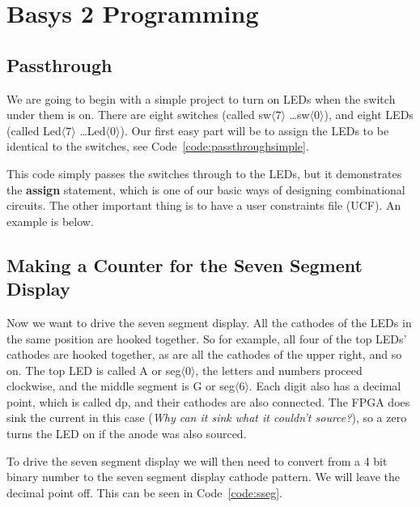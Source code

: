 \chapter{Basys 2 Programming}

\section{Passthrough}

We are going to begin with a simple project to turn on LEDs when the switch under them is on.  There are eight switches (called sw$\langle 7\rangle$ \ldots sw$\langle 0\rangle$), and eight LEDs  (called Led$\langle 7\rangle$ \ldots Led$\langle 0\rangle$).  Our first easy part will be to assign the LEDs to be identical to the switches, see Code~\ref{code:passthroughsimple}.


This code simply passes the switches through to the LEDs, but it demonstrates the \textbf{assign} statement, which is one of our basic ways of designing combinational circuits.  The other important thing is to have a user constraints file (UCF).  An example is below.


\section{Making a Counter for the Seven Segment Display}

Now we want to drive the seven segment display.  All the cathodes of the LEDs in the same position are hooked together.  So for example, all four of the top LEDs' cathodes are hooked together, as are all the cathodes of the upper right, and so on.  The top LED is called A or seg$\langle 0\rangle$, the letters and numbers proceed clockwise, and the middle segment is G or seg$\langle 6\rangle$.  Each digit also has a decimal point, which is called dp, and their cathodes are also connected.   The FPGA does sink the current in this case (\emph{Why can it sink what it couldn't source?}), so a zero turns the LED on if the anode was also sourced.

To drive the seven segment display we will then need to convert from a 4 bit binary number to the seven segment display cathode pattern.  We will leave the decimal point off.  This can be seen in Code~\ref{code:sseg}.

